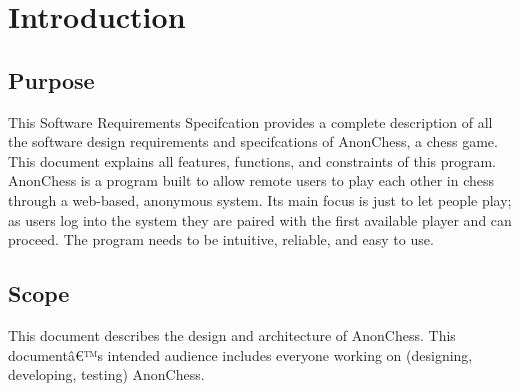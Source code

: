 \section{Introduction}

\subsection{Purpose}
This Software Requirements Specifcation provides a complete description of all the software design requirements and specifcations of AnonChess, a chess game. This document explains all features, functions, and constraints of this program.
AnonChess is a program built to allow remote users to play each other in chess through a web-based, anonymous system. Its main focus is just to let people play; as users log into the system they are paired with the first available player and can proceed. The program needs to be intuitive, reliable, and easy to use.
  
\subsection{Scope}
This document describes the design and architecture of AnonChess. This documentâ€™s intended audience includes everyone working on (designing, developing, testing) AnonChess.
